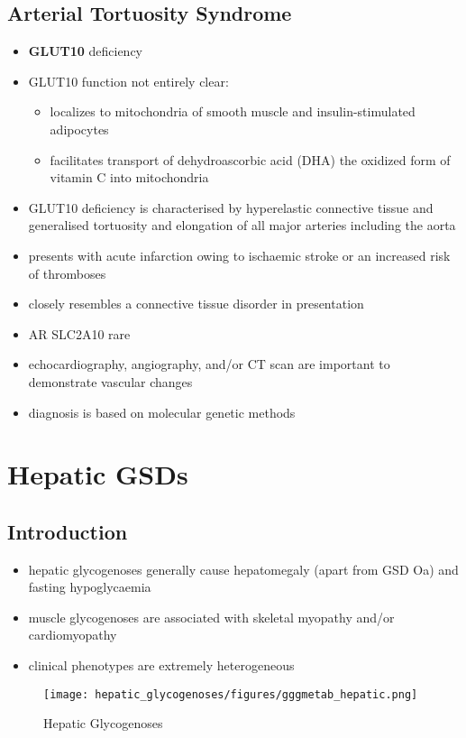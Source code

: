 \documentclass[12pt]{scrartcl}
\begin{document}
\subsection{Arterial Tortuosity Syndrome}
\label{sec:org22f80cb}
\begin{itemize}
\item \textbf{GLUT10} deficiency
\item GLUT10 function not entirely clear:
\begin{itemize}
\item localizes to mitochondria of smooth muscle and insulin-stimulated adipocytes
\item facilitates transport of dehydroascorbic acid (DHA) the
oxidized form of vitamin C into mitochondria
\end{itemize}
\item GLUT10 deficiency is characterised by hyperelastic connective tissue
and generalised tortuosity and elongation of all major arteries
including the aorta
\item presents with acute infarction owing to ischaemic stroke or an
increased risk of thromboses
\item closely resembles a connective tissue disorder in presentation
\item AR SLC2A10 rare
\item echocardiography, angiography, and/or CT scan are important to demonstrate vascular changes
\item diagnosis is based on molecular genetic methods
\end{itemize}
\section{Hepatic GSDs}
\label{sec:org4e359da}
\subsection{Introduction}
\label{sec:org29e66b0}
\begin{itemize}
\item hepatic glycogenoses generally cause hepatomegaly (apart from GSD
Oa) and fasting hypoglycaemia
\item muscle glycogenoses are associated with skeletal myopathy and/or
cardiomyopathy
\item clinical phenotypes are extremely heterogeneous
\end{itemize}

\begin{figure}[htbp]
\centering
\texttt{[image: hepatic\_glycogenoses/figures/gggmetab\_hepatic.png]}
\caption{\label{fig:org1c3dd7a}Hepatic Glycogenoses}
\end{figure}
\end{document}
